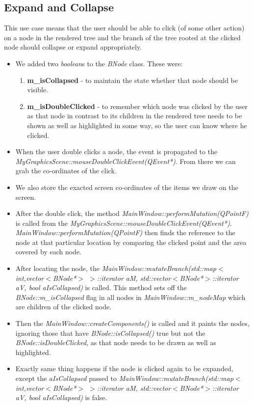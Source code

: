 \subsection{Expand and Collapse}
\par{This use case means that the user should be able to click (of some other action) on a node in the rendered tree and the branch of the tree rooted at the clicked node should collapse or expand appropriately.} \\
\begin{itemize}
 \item We added two \emph{boolean}s to the \emph{BNode} class. These were:
  \begin{enumerate}
   \item \textbf{m\_isCollapsed} - to maintain the state whether that node should be visible.
   \item \textbf{m\_isDoubleClicked}  - to remember which node was clicked by the user as that node in contrast to its children in the rendered tree needs to be shown as well as highlighted in some way, so the user can know where he clicked.   
  \end{enumerate}
 \item When the user double clicks a node, the event is propagated to the \emph{MyGraphicsScene::mouseDoubleClickEvent(QEvent*)}. From there we can grab the co-ordinates of the click.
 \item We also store the exacted screen co-ordinates of the items we draw on the screen.
 \item After the double click, the method \emph{MainWindow::performMutation(QPointF)} is called from the \emph{MyGraphicsScene::mouseDoubleClickEvent(QEvent*)}. \emph{MainWindow::performMutation(QPointF)} then finds the reference to the node at that particular location by comparing the clicked point and the area covered by each node.
 \item After locating the node, the \emph{MainWindow::mutateBranch(std::map$<$int,vector$<$BNode*$>$ $>$::iterator aM, std::vector$<$BNode*$>$::iterator aV, bool aIsCollapsed)} is called. This method sets off the \emph{BNode::m\_isCollapsed} flag in all nodes in \emph{MainWindow::m\_nodeMap} which are children of the clicked node.
 \item Then the \emph{MainWindow::createComponents()} is called and it paints the nodes, ignoring those that have \emph{BNode::isCollapsed()} true but not the \emph{BNode::isDoubleClicked}, as that node needs to be drawn as well as highlighted.
 \item Exactly same thing happens if the node is clicked again to be expanded, except the \emph{aIsCollapsed} passed to \emph{MainWindow::mutateBranch(std::map$<$int,vector$<$BNode*$>$ $>$::iterator aM, std::vector$<$BNode*$>$::iterator aV, bool aIsCollapsed)} is false.
\end{itemize}